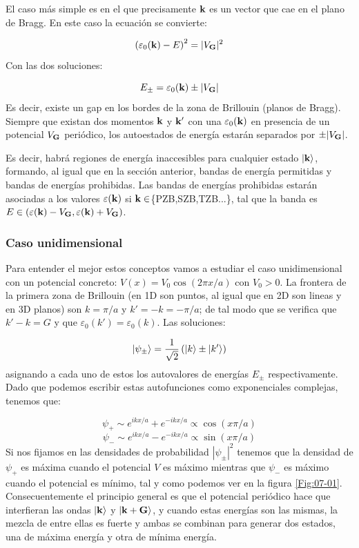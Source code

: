 El caso más simple es en el que precisamente $\mathbf{k}$ es un vector que cae en el plano de Bragg. En este caso la ecuación se convierte:

\begin{equation}
	\left( \varepsilon_0 (\mathbf{k})-E \right)^2 =|V_{\mathbf{G}}|^2
\end{equation}
Con las dos soluciones:

\begin{equation}
	E_\pm = \varepsilon_0 (\mathbf{k}) \pm |V_{\mathbf{G}}|
\end{equation}
Es decir, existe un gap en los bordes de la zona de Brillouin (planos de Bragg). Siempre que existan dos momentos $\mathbf{k}$ y $\mathbf{k}'$ con una $\varepsilon_0(\mathbf{k})$ en presencia de un potencial $V_{\mathbf{G}}$ periódico, los autoestados de energía estarán separados por $\pm |V_{\mathbf{G}}|$.

Es decir, habrá regiones de energía inaccesibles para cualquier estado $|\mathbf{k}\rangle$, formando, al igual que en la sección anterior, bandas de energía permitidas y bandas de energías prohibidas. Las bandas de energías prohibidas estarán asociadas a los valores $\varepsilon(\mathbf{k})$ si $\mathbf{k} \in $\{PZB,SZB,TZB...\}, tal que la banda es $E\in (\varepsilon(\mathbf{k})-V_{\mathbf{G}},\varepsilon(\mathbf{k})+V_{\mathbf{G}})$. 

\subsubsection{Caso unidimensional}

Para entender el mejor estos conceptos vamos a estudiar el caso unidimensional con un potencial concreto: $V(x)=V_0 \cos (2\pi x/a)$ con $V_0>0$. La frontera de la primera zona de Brillouin (en 1D son puntos, al igual que en 2D son lineas y en 3D planos) son $k=\pi/a$ y $k'=-k=-\pi/a$; de tal modo que se verifica que $k'-k=G$ y que $\varepsilon_0 (k')= \varepsilon_0(k)$. Las soluciones:  

\begin{equation}
	|\psi_\pm \rangle = \frac{1}{\sqrt{2}} \left( |k\rangle \pm |k'\rangle \right)
\end{equation}
asignando a cada uno de estos los autovalores de energías $E_\pm$ respectivamente. Dado que podemos escribir estas autofunciones como exponenciales complejas, tenemos que:

\begin{equation*}
	\psi_+ \sim e^{ikx/a}+e^{-ikx/a} \propto \cos (x\pi/a)
\end{equation*} 
\begin{equation*}
	\psi_- \sim e^{ikx/a}-e^{-ikx/a} \propto \sin (x\pi/a)
\end{equation*} 
Si nos fijamos en las densidades de probabilidad $|\psi_\pm|^2$ tenemos que la densidad de $\psi_+$ es máxima cuando el potencial $V$ es máximo mientras que $\psi_-$ es máximo cuando el potencial es mínimo, tal y como podemos ver en la figura \ref{Fig:07-01}. Consecuentemente el principio general es que el potencial periódico hace que interfieran las ondas $|\mathbf{k}\rangle $ y $|\mathbf{k}+\mathbf{G}\rangle$, y cuando estas energías son las mismas, la mezcla de entre ellas es fuerte y ambas se combinan para generar dos estados, una de máxima energía y otra de mínima energía. 


